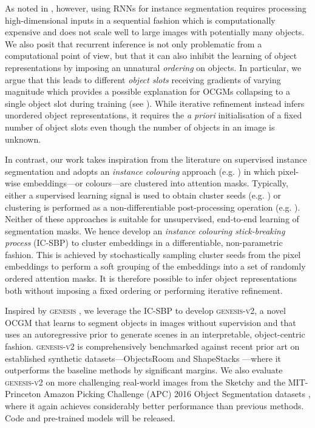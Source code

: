 \documentclass{article}
\begin{document}
As noted in \citet{novotny2018semi}, however, using RNNs for instance segmentation requires processing high-dimensional inputs in a sequential fashion which is computationally expensive and does not scale well to large images with potentially many objects.
We also posit that recurrent inference is not only problematic from a computational point of view, but that it can also inhibit the learning of object representations by imposing an unnatural \emph{ordering} on objects.
In particular, we argue that this leads to different \emph{object slots} receiving gradients of varying magnitude which provides a possible explanation for OCGMs collapsing to a single object slot during training (see \cite{engelcke2020reconstruction}).
While iterative refinement instead infers unordered object representations, it requires the \emph{a priori} initialisation of a fixed number of object slots even though the number of objects in an image is unknown.

In contrast, our work takes inspiration from the literature on supervised instance segmentation and adopts an \emph{instance colouring} approach (e.g. \cite{novotny2018semi,fathi2017semantic,bai2017deep,debrabandere2017semantic}) in which pixel-wise embeddings---or colours---are clustered into attention masks.
Typically, either a supervised learning signal is used to obtain cluster seeds (e.g. \cite{novotny2018semi,fathi2017semantic}) or clustering is performed as a  non-differentiable post-processing operation (e.g. \cite{bai2017deep,debrabandere2017semantic}).
Neither of these approaches is suitable for unsupervised, end-to-end learning of segmentation masks.
We hence develop an \emph{instance colouring stick-breaking process} (IC-SBP) to cluster embeddings in a differentiable, non-parametric fashion.
This is achieved by stochastically sampling cluster seeds from the pixel embeddings to perform a soft grouping of the embeddings into a set of randomly ordered attention masks.
It is therefore possible to infer object representations both without imposing a fixed ordering or performing iterative refinement.

Inspired by \textsc{genesis} \cite{engelcke2020genesis}, we leverage the IC-SBP to develop \textsc{genesis-v2}, a novel OCGM that learns to segment objects in images without supervision and that uses an autoregressive prior to generate scenes in an interpretable, object-centric fashion.
\textsc{genesis-v2} is comprehensively benchmarked against recent prior art \cite{burgess2019monet,engelcke2020genesis,locatello2020object} on established synthetic datasets---ObjectsRoom \cite{multiobjectdatasets19} and ShapeStacks \cite{groth2018shapestacks}---where it outperforms the baseline methods by significant margins.
We also evaluate \textsc{genesis-v2} on more challenging real-world images from the Sketchy \cite{cabi2019scaling} and the MIT-Princeton Amazon Picking Challenge (APC) 2016 Object Segmentation datasets \cite{zeng2016multi}, where it again achieves considerably better performance than previous methods.
Code and pre-trained models will be released.
\end{document}
